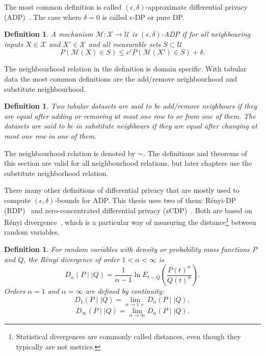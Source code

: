 \documentclass[english,twoside,openright]{HYgraduMLDS}
\newtheorem{definition}[lemma]{Definition}
\newcommand{\dmid}{\mid\mid}
\newcommand{\calm}{{\mathcal{M}}}
\newcommand{\calx}{{\mathcal{X}}}
\newcommand{\calu}{{\mathcal{U}}}
\begin{document}
The most common definition is called \((\epsilon, \delta)\)-approximate
differential privacy (ADP)~\cite{DKM06, DwR14}.
The case where \(\delta = 0\) is called \(\epsilon\)-DP or 
pure DP.

\begin{definition}\label{ADP-definition}
    A mechanism \(\calm\colon \calx \to \calu\) is \((\epsilon, \delta)\)-ADP if
    for all neighbouring inputs \(X\in \calx\) and \(X'\in \calx\) and
    all measurable sets \(S \subset \calu\)
    \[
        P(\calm(X)\in S) \leq e^\epsilon P(\calm(X')\in S) + \delta.
    \]
\end{definition}

The neighbourhood relation in the definition is domain specific. With tabular 
data the most common definitions are the add/remove neighbourhood and 
substitute neighbourhood.
\begin{definition}
    Two tabular datasets are said to be add/remove neighbours if they are equal 
    after adding or removing at most one row to or from one of them. The datasets 
    are said to be in substitute neighbours if they are equal after 
    changing at most one row in one of them.
\end{definition}
The neighbourhood relation is denoted by \(\sim\). The definitions and 
theorems of this section are valid for all neighbourhood relations, but later
chapters use the substitute neighborhood relation.

There many other definitions of differential privacy that are mostly used
to compute \((\epsilon, \delta)\)-bounds for ADP. This thesis uses two of them: 
Rényi-DP (RDP)~\cite{Mironov17} and 
zero-concentrated differential privacy (zCDP)~\cite{BuS16}. Both are based 
on Rényi divergence~\cite{Mironov17}, which is a particular way of 
measuring the distance\footnote{
  Statistical divergences are commonly called distances, even though they
  typically are not metrics.
} between random variables.

\begin{definition}
    For random variables with density or probability mass functions 
    \(P\) and \(Q\), the Rényi divergence of order
    \(1 < \alpha < \infty\) is
    \[
        D_\alpha(P\dmid Q) = \frac{1}{\alpha - 1}\ln E_{t\sim Q}
        \left(\frac{P(t)^\alpha}{Q(t)^\alpha}\right).
    \]
    Orders \(\alpha = 1\) and \(\alpha = \infty\) are defined 
    by continuity:
    \[
        D_1(P\dmid Q) = \lim_{\alpha \to 1+} D_\alpha(P\dmid Q),
    \]
    \[
        D_\infty(P \dmid Q) = \lim_{\alpha\to \infty}D_\alpha(P\dmid Q).
    \]
\end{definition}
\end{document}
